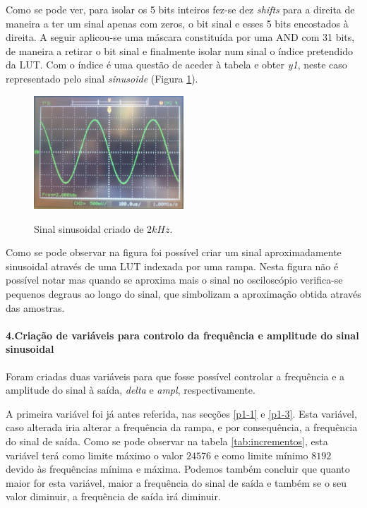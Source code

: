\documentclass[11pt]{article}
\numberwithin{equation}{section}
\begin{document}
	Como se pode ver, para isolar os 5 bits inteiros fez-se dez \textit{shifts} para a direita de maneira a ter um sinal apenas com zeros, o bit sinal e esses 5 bits encostados à direita. A seguir aplicou-se uma máscara constituída por uma AND com 31 bits, de maneira a retirar o bit sinal e finalmente isolar num sinal o índice pretendido da LUT. Com o índice é uma questão de aceder à tabela e obter \textit{y1}, neste caso representado pelo sinal \textit{sinusoide} (Figura \ref{fig:sen2k}).
	\begin{figure}[H]
		\centering
		\includegraphics[width=0.5\textwidth]{./P1_1seno}~\\
		\caption{Sinal sinusoidal criado de $ 2 kHz $.}
		\label{fig:sen2k}
	\end{figure}
	
	Como se pode observar na figura foi possível criar um sinal aproximadamente sinusoidal através de uma LUT indexada por uma rampa. Nesta figura não é possível notar mas quando se aproxima mais o sinal no osciloscópio verifica-se pequenos degraus ao longo do sinal, que simbolizam a aproximação obtida através das amostras.
	
	\paragraph{4.Criação de variáveis para controlo da frequência e amplitude do sinal sinusoidal} \hspace{0pt}
	\label{p1-4}
	
	Foram criadas duas variáveis para que fosse possível controlar a frequência e a amplitude do sinal à saída, \textit{delta} e \textit{ampl}, respectivamente.
	
	A primeira variável foi já antes referida, nas secções \ref{p1-1} e \ref{p1-3}. Esta variável, caso alterada iria alterar a frequência da rampa, e por consequência, a frequência do sinal de saída. Como se pode observar na tabela \ref{tab:incrementos}, esta variável terá como limite máximo o valor $ 24576 $ e como limite mínimo $ 8192 $ devido às frequências mínima e máxima. Podemos também concluir que quanto maior for esta variável, maior a frequência do sinal de saída e também se o seu valor diminuir, a frequência de saída irá diminuir.
	
\end{document}
